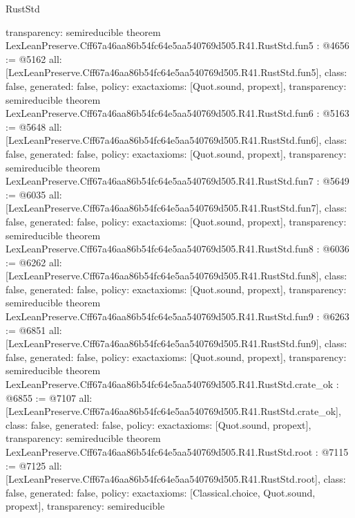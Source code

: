 \begin{lexlean}{RustStd}
\begin{coremodule}
{  transparency: semireducible
}
theorem LexLeanPreserve.Cff67a46aa86b54fc64e5aa540769d505.R41.RustStd.fun5 : @4656 := @5162 {
  all: [LexLeanPreserve.Cff67a46aa86b54fc64e5aa540769d505.R41.RustStd.fun5],
  class: false,
  generated: false,
  policy: exact{axioms: [Quot.sound, propext]},
  transparency: semireducible
}
theorem LexLeanPreserve.Cff67a46aa86b54fc64e5aa540769d505.R41.RustStd.fun6 : @5163 := @5648 {
  all: [LexLeanPreserve.Cff67a46aa86b54fc64e5aa540769d505.R41.RustStd.fun6],
  class: false,
  generated: false,
  policy: exact{axioms: [Quot.sound, propext]},
  transparency: semireducible
}
theorem LexLeanPreserve.Cff67a46aa86b54fc64e5aa540769d505.R41.RustStd.fun7 : @5649 := @6035 {
  all: [LexLeanPreserve.Cff67a46aa86b54fc64e5aa540769d505.R41.RustStd.fun7],
  class: false,
  generated: false,
  policy: exact{axioms: [Quot.sound, propext]},
  transparency: semireducible
}
theorem LexLeanPreserve.Cff67a46aa86b54fc64e5aa540769d505.R41.RustStd.fun8 : @6036 := @6262 {
  all: [LexLeanPreserve.Cff67a46aa86b54fc64e5aa540769d505.R41.RustStd.fun8],
  class: false,
  generated: false,
  policy: exact{axioms: [Quot.sound, propext]},
  transparency: semireducible
}
theorem LexLeanPreserve.Cff67a46aa86b54fc64e5aa540769d505.R41.RustStd.fun9 : @6263 := @6851 {
  all: [LexLeanPreserve.Cff67a46aa86b54fc64e5aa540769d505.R41.RustStd.fun9],
  class: false,
  generated: false,
  policy: exact{axioms: [Quot.sound, propext]},
  transparency: semireducible
}
theorem LexLeanPreserve.Cff67a46aa86b54fc64e5aa540769d505.R41.RustStd.crate_ok : @6855 := @7107 {
  all: [LexLeanPreserve.Cff67a46aa86b54fc64e5aa540769d505.R41.RustStd.crate_ok],
  class: false,
  generated: false,
  policy: exact{axioms: [Quot.sound, propext]},
  transparency: semireducible
}
theorem LexLeanPreserve.Cff67a46aa86b54fc64e5aa540769d505.R41.RustStd.root : @7115 := @7125 {
  all: [LexLeanPreserve.Cff67a46aa86b54fc64e5aa540769d505.R41.RustStd.root],
  class: false,
  generated: false,
  policy: exact{axioms: [Classical.choice, Quot.sound, propext]},
  transparency: semireducible
}


\end{coremodule}
\end{lexlean}
